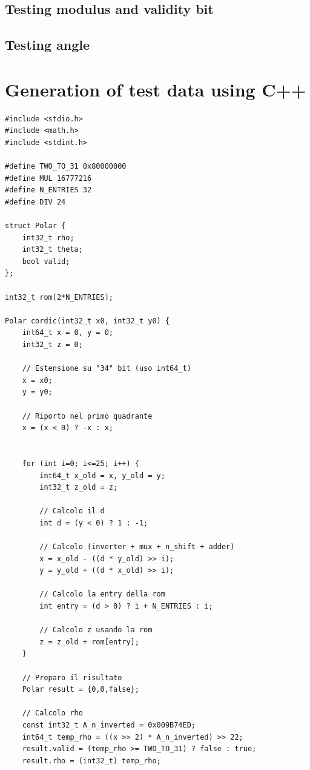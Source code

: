 \documentclass[12pt,a4paper]{report}
\begin{document}
\begin{itemize}
\subsection{Testing modulus and validity bit}

\subsection{Testing angle}

\section{Generation of test data using C++}

\begin{lstlisting}[caption={Test-data generation}]
#include <stdio.h>
#include <math.h>
#include <stdint.h>

#define TWO_TO_31 0x80000000
#define MUL 16777216
#define N_ENTRIES 32
#define DIV 24

struct Polar {
    int32_t rho;
    int32_t theta;
    bool valid;
};

int32_t rom[2*N_ENTRIES];

Polar cordic(int32_t x0, int32_t y0) {
    int64_t x = 0, y = 0;
    int32_t z = 0;
    
    // Estensione su "34" bit (uso int64_t)
    x = x0;
    y = y0;
    
    // Riporto nel primo quadrante
    x = (x < 0) ? -x : x;
    
    
    for (int i=0; i<=25; i++) {
        int64_t x_old = x, y_old = y;
        int32_t z_old = z;
        
        // Calcolo il d
        int d = (y < 0) ? 1 : -1;
        
        // Calcolo (inverter + mux + n_shift + adder)
        x = x_old - ((d * y_old) >> i);
        y = y_old + ((d * x_old) >> i);
        
        // Calcolo la entry della rom
        int entry = (d > 0) ? i + N_ENTRIES : i;
        
        // Calcolo z usando la rom
        z = z_old + rom[entry];
    }
    
    // Preparo il risultato
    Polar result = {0,0,false};
    
    // Calcolo rho
    const int32_t A_n_inverted = 0x009B74ED;
    int64_t temp_rho = ((x >> 2) * A_n_inverted) >> 22;
    result.valid = (temp_rho >= TWO_TO_31) ? false : true;
    result.rho = (int32_t) temp_rho;
    

\end{lstlisting}
\end{itemize}
\end{document}
